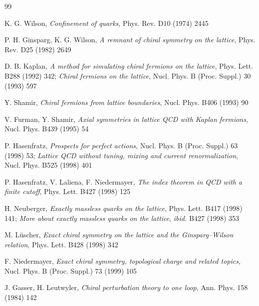 \begin{thebibliography}{99}

K. G. Wilson, {\it Confinement of quarks}, Phys. Rev. D10 (1974) 2445




P. H. Ginsparg, K. G. Wilson,
{\it A remnant of chiral symmetry on the lattice},
Phys. Rev. D25 (1982) 2649



D. B. Kaplan,
{\it A method for simulating chiral fermions on the lattice},
Phys. Lett. B288 (1992) 342;
{\it Chiral fermions on the lattice},
Nucl. Phys. B (Proc. Suppl.) 30 (1993) 597

Y. Shamir,
{\it Chiral fermions from lattice boundaries},
Nucl. Phys. B406 (1993) 90

V. Furman, Y. Shamir,
{\it Axial symmetries in lattice QCD with Kaplan fermions},
Nucl. Phys. B439 (1995) 54



P. Hasenfratz, {\it Prospects for perfect actions},
Nucl. Phys. B (Proc. Suppl.) 63 (1998) 53;
{\it Lattice QCD without tuning, mixing and current renormalization},
Nucl. Phys. B525 (1998) 401

P. Hasenfratz, V. Laliena, F. Niedermayer,
{\it The index theorem in QCD with a finite cutoff},
Phys. Lett. B427 (1998) 125



H. Neuberger,
{\it Exactly massless quarks on the lattice},
Phys. Lett. B417 (1998) 141;
{\it More about exactly massless quarks on the lattice},
{\it ibid.}\/ B427 (1998) 353



M. L\"uscher,
{\it Exact chiral symmetry on the lattice and the Ginsparg--Wilson relation},
Phys. Lett. B428 (1998) 342

F. Niedermayer,
{\it Exact chiral symmetry, topological charge and related topics},
Nucl. Phys. B (Proc. Suppl.) 73 (1999) 105



J. Gasser, H. Leutwyler,
{\it Chiral perturbation theory to one loop},
Ann. Phys. 158 (1984) 142



\end{thebibliography}
